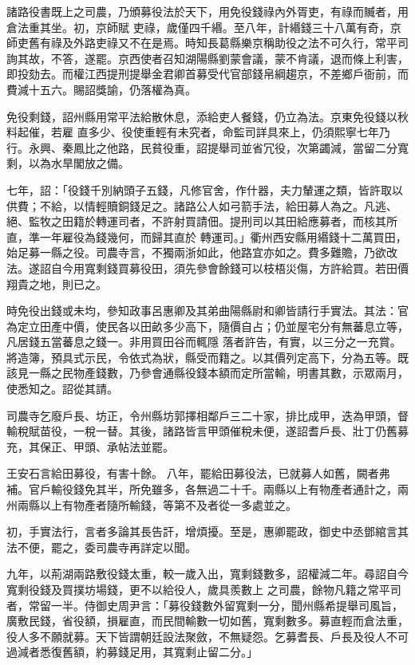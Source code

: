 \begin{pinyinscope}
 諸路役書既上之司農，乃頒募役法於天下，用免役錢祿內外胥吏，有祿而贓者，用倉法重其坐。初，京師賦
 吏祿，歲僅四千緡。至八年，計緡錢三十八萬有奇，京師吏舊有祿及外路吏祿又不在是焉。時知長葛縣樂京稱助役之法不可久行，常平司詢其故，不答，遂罷。京西使者召知湖陽縣劉蒙會議，蒙不肯議，退而條上利害，即投劾去。而權江西提刑提舉金君卿首募受代官部錢帛綱趨京，不差鄉戶衙前，而費減十五六。賜詔獎諭，仍落權為真。



 免役剩錢，詔州縣用常平法給散休息，添給吏人餐錢，仍立為法。京東免役錢以秋料起催，若雇
 直多少、役使重輕有未究者，命監司詳具來上，仍須熙寧七年乃行。永興、秦鳳比之他路，民貧役重，詔提舉司並省冗役，次第蠲減，當留二分寬剩，以為水旱閣放之備。



 七年，詔：「役錢千別納頭子五錢，凡修官舍，作什器，夫力輦運之類，皆許取以供費；不給，以情輕贖銅錢足之。諸路公人如弓箭手法，給田募人為之。凡逃、絕、監牧之田籍於轉運司者，不許射買請佃。提刑司以其田給應募者，而核其所直，準一年雇役為錢幾何，而歸其直於
 轉運司。」衢州西安縣用緡錢十二萬買田，始足募一縣之役。司農寺言，不獨兩浙如此，他路宜亦如之。費多難贍，乃欲改法。遂詔自今用寬剩錢買募役田，須先參會餘錢可以枝梧災傷，方許給買。若田價翔貴之地，則已之。



 時免役出錢或未均，參知政事呂惠卿及其弟曲陽縣尉和卿皆請行手實法。其法：官為定立田產中價，使民各以田畝多少高下，隨價自占；仍並屋宅分有無蕃息立等，凡居錢五當蕃息之錢一。非用買田谷而輒隱
 落者許告，有實，以三分之一充賞。將造簿，預具式示民，令依式為狀，縣受而籍之。以其價列定高下，分為五等。既該見一縣之民物產錢數，乃參會通縣役錢本額而定所當輸，明書其數，示眾兩月，使悉知之。詔從其請。



 司農寺乞廢戶長、坊正，令州縣坊郭擇相鄰戶三二十家，排比成甲，迭為甲頭，督輸稅賦苗役，一稅一替。其後，諸路皆言甲頭催稅未便，遂詔耆戶長、壯丁仍舊募充，其保正、甲頭、承帖法並罷。



 王安石言給田募役，有害十餘。
 八年，罷給田募役法，已就募人如舊，闕者弗補。官戶輸役錢免其半，所免雖多，各無過二十千。兩縣以上有物產者通計之，兩州兩縣以上有物產者隨所輸錢，等第不及者從一多處並之。



 初，手實法行，言者多論其長告訐，增煩擾。至是，惠卿罷政，御史中丞鄧綰言其法不便，罷之，委司農寺再詳定以聞。



 九年，以荊湖兩路敷役錢太重，較一歲入出，寬剩錢數多，詔權減二年。尋詔自今寬剩役錢及買撲坊場錢，更不以給役人，歲具羨數上
 之司農，餘物凡籍之常平司者，常留一半。侍御史周尹言：「募役錢數外留寬剩一分，聞州縣希提舉司風旨，廣敷民錢，省役額，損雇直，而民間輸數一切如舊，寬剩數多。募直輕而倉法重，役人多不願就募。天下皆謂朝廷設法聚斂，不無疑怨。乞募耆長、戶長及役人不可過減者悉復舊額，約募錢足用，其寬剩止留二分。」




\end{pinyinscope}
